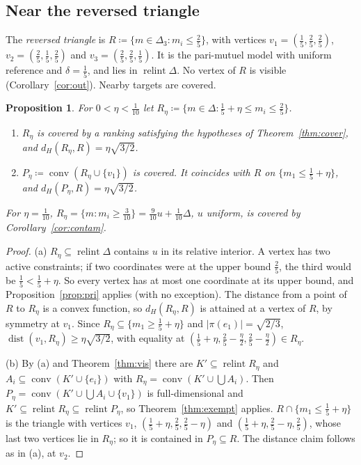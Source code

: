 \documentclass[11pt]{article}
\DeclareMathOperator{\conv}{conv}
\DeclareMathOperator{\relint}{relint}
\theoremstyle{plain}
\newtheorem{proposition}[theorem]{Proposition}
\theoremstyle{definition}
\theoremstyle{remark}
\begin{document}
\subsection{Near the reversed triangle}

The \emph{reversed triangle} is $R\coloneqq\{m\in\Delta_3:m_i\le\frac25\}$, with vertices
$v_1=(\frac15,\frac25,\frac25)$, $v_2=(\frac25,\frac15,\frac25)$ and
$v_3=(\frac25,\frac25,\frac15)$. It is the pari-mutuel model with uniform reference and
$\delta=\frac15$, and lies in $\relint\Delta$. No vertex of $R$ is visible
(Corollary~\ref{cor:out}). Nearby targets are covered.

\begin{proposition}\label{prop:trunc}
For $0<\eta<\frac1{10}$ let $R_\eta\coloneqq\{m\in\Delta:\frac15+\eta\le m_i\le\frac25\}$.
\begin{enumerate}[label=(\alph*)]
  \item $R_\eta$ is covered by a ranking satisfying the hypotheses of
  Theorem~\ref{thm:cover}, and $d_H(R_\eta,R)=\eta\sqrt{3/2}$.
  \item $P_\eta\coloneqq\conv(R_\eta\cup\{v_1\})$ is covered. It coincides with $R$ on
  $\{m_1\le\frac15+\eta\}$, and $d_H(P_\eta,R)=\eta\sqrt{3/2}$.
\end{enumerate}
For $\eta=\frac1{10}$, $R_\eta=\{m:m_i\ge\frac3{10}\}=\frac9{10}u+\frac1{10}\Delta$, $u$
uniform, is covered by Corollary~\ref{cor:contam}.
\end{proposition}

\begin{proof}
(a) $R_\eta\subseteq\relint\Delta$ contains $u$ in its relative interior. A vertex has two
active constraints; if two coordinates were at the upper bound $\frac25$, the third would
be $\frac15<\frac15+\eta$. So every vertex has at most one coordinate at its upper bound,
and Proposition~\ref{prop:pri} applies (with no exception). The distance from a point of
$R$ to $R_\eta$ is a convex function, so $d_H(R_\eta,R)$ is attained at a vertex of $R$,
by symmetry at $v_1$. Since $R_\eta\subseteq\{m_1\ge\frac15+\eta\}$ and $|\pi(e_1)|=
\sqrt{2/3}$, $\operatorname{dist}(v_1,R_\eta)\ge\eta\sqrt{3/2}$, with equality at
$(\frac15+\eta,\frac25-\frac\eta2,\frac25-\frac\eta2)\in R_\eta$.

(b) By (a) and Theorem~\ref{thm:vis} there are $K'\subseteq\relint R_\eta$ and
$A_i\subseteq\conv(K'\cup\{e_i\})$ with $R_\eta=\conv(K'\cup\bigcup A_i)$. Then
$P_\eta=\conv(K'\cup\bigcup A_i\cup\{v_1\})$ is full-dimensional and $K'\subseteq
\relint R_\eta\subseteq\relint P_\eta$, so Theorem~\ref{thm:exempt} applies.
$R\cap\{m_1\le\frac15+\eta\}$ is the triangle with vertices $v_1$,
$(\frac15+\eta,\frac25,\frac25-\eta)$ and $(\frac15+\eta,\frac25-\eta,\frac25)$, whose last
two vertices lie in $R_\eta$; so it is contained in $P_\eta\subseteq R$. The distance
claim follows as in (a), at $v_2$.
\end{proof}
\end{document}
